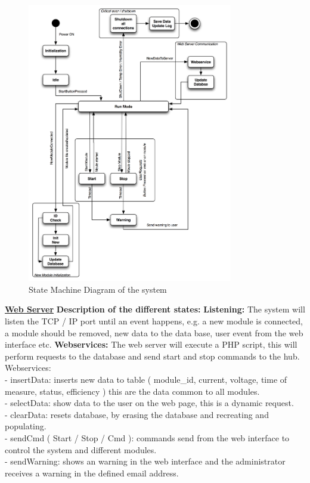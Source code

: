 	\begin{figure}[H]
		\begin{centering}
			 \includegraphics[width=0.8\textwidth]{images/statemachine.png}
		\caption{State Machine Diagram of the system}
	 	\end{centering}
	\end{figure}
	
\underline{\textbf{Web Server\:}}
\p \textbf{Description of the different states: }
	\textbf{Listening: }The system will listen the TCP / IP port until an event happens, e.g.  a new module is connected, a module should be removed, new data to the data base, user event from the web interface etc.
	\textbf{Webservices:} The web server will execute a PHP script, this will perform requests to the database and send start and stop commands to the hub.
	\p
	Webservices:
	\\- insertData: inserts new data to table ( module\_id, current, voltage, time of measure, status, efficiency  ) this are the data common to all modules.
	\\- selectData: show data to the user on the web page, this is a dynamic request.
	\\- clearData: resets database, by erasing the database and recreating and populating.
	\\- sendCmd ( Start / Stop / Cmd ): commands send from the web interface to control the system and different modules.
	\\- sendWarning: shows an warning in the web interface and the administrator receives a warning in the defined email address.
	

